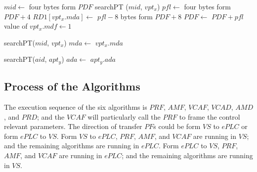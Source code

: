 \documentclass[journal,UTF8]{IEEEtran}
\begin{document}
\begin{algorithm}
	\label{alg4}
	\caption{$VCAD$}%
    $mid \leftarrow$ four bytes form $PDF$\;
    searchPT ($mid$, $vpt_x$)\;
    $pfl \leftarrow$ four bytes form $PDF+4$\; 
    $RD1[vpt_x.mda]\leftarrow$ $pfl-8$ bytes form $PDF+8$\;     	
	$PDF\leftarrow$ $PDF+pfl$\;
	value of $vpt_x.mdf\leftarrow 1$\;
\end{algorithm}

\begin{algorithm}
	\label{alg5}
	\caption{$AMD$}%
	searchPT($mid$, $vpt_x$)\;
	$mda\leftarrow$ $vpt_x.mda$\;	
\end{algorithm}

\begin{algorithm}
	\label{alg6}
	\caption{$PRD$}%
	searchPT($aid$, $apt_y$)\;
	$ada\leftarrow$ $apt_y.ada$\;
\end{algorithm}
\subsection{Process of the Algorithms}

The execution sequence of the six algorithms is $PRF$, $AMF$, $VCAF$, $VCAD$, $AMD$, and $PRD$; and the $VCAF$ will particularly call the $PRF$ to frame the control relevant parameters. The direction of transfer $PF$s could be form $VS$ to $ePLC$ or form $ePLC$ to $VS$. Form $VS$ to $ePLC$, $PRF$, $AMF$, and $VCAF$ are running in $VS$; and the remaining algorithms are running in $ePLC$. Form $ePLC$ to $VS$, $PRF$, $AMF$, and $VCAF$ are running in $ePLC$; and the remaining algorithms are running in $VS$.
%
\end{document}
